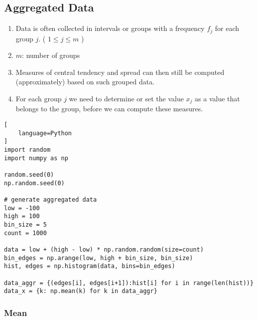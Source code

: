 \subsection{Aggregated Data \cite{statistics/book/Statistics-for-Data-Scientists/Maurits-Kaptein}}\label{Data/Describing Data/Aggregated Data}

\begin{enumerate}
    \item Data is often collected in intervals or groups with a frequency $f_j$ for each group $j$. ( $1 \leq j \leq m$ ) \hfill \cite{statistics/book/Statistics-for-Data-Scientists/Maurits-Kaptein}

    \item $m$: number of groups \hfill \cite{statistics/book/Statistics-for-Data-Scientists/Maurits-Kaptein}

    \item Measures of central tendency and spread can then still be computed (approximately) based on such grouped data. \hfill \cite{statistics/book/Statistics-for-Data-Scientists/Maurits-Kaptein}

    \item For each group $j$ we need to determine or set the value $x_j$ as a value that belongs to the group, before we can compute these measures. \hfill \cite{statistics/book/Statistics-for-Data-Scientists/Maurits-Kaptein}

    
\end{enumerate}


\begin{lstlisting}[
    language=Python
]
import random
import numpy as np

random.seed(0)
np.random.seed(0)

# generate aggregated data
low = -100
high = 100
bin_size = 5
count = 1000

data = low + (high - low) * np.random.random(size=count)
bin_edges = np.arange(low, high + bin_size, bin_size)
hist, edges = np.histogram(data, bins=bin_edges)

data_aggr = {(edges[i], edges[i+1]):hist[i] for i in range(len(hist))}
data_x = {k: np.mean(k) for k in data_aggr}
\end{lstlisting}

\subsubsection{Mean \cite{statistics/book/Statistics-for-Data-Scientists/Maurits-Kaptein}}\label{Data/Describing Data/Aggregated Data/Mean}


